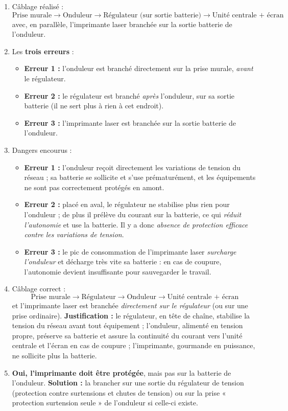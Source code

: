 \documentclass[11pt]{article}
\newcommand{\cle}[1]{{\popxbold\color{popdark}#1}}
\begin{document}
\begin{corrige}
\begin{enumerate}
\item Câblage réalisé :
\[ \text{Prise murale} \rightarrow \text{Onduleur} \rightarrow \text{Régulateur (sur sortie batterie)} \rightarrow \text{Unité centrale + écran} \]
avec, en parallèle, l'imprimante laser branchée sur la sortie batterie de l'onduleur.
\item Les \textbf{trois erreurs} :
\begin{itemize}
\item \textbf{Erreur 1 :} l'onduleur est branché directement sur la prise murale, \emph{avant} le régulateur.
\item \textbf{Erreur 2 :} le régulateur est branché \emph{après} l'onduleur, sur sa sortie batterie (il ne sert plus à rien à cet endroit).
\item \textbf{Erreur 3 :} l'imprimante laser est branchée sur la sortie batterie de l'onduleur.
\end{itemize}
\item Dangers encourus :
\begin{itemize}
\item \textbf{Erreur 1 :} l'onduleur reçoit directement les variations de tension du réseau ; sa batterie se sollicite et s'use prématurément, et les équipements ne sont pas correctement protégés en amont.
\item \textbf{Erreur 2 :} placé en aval, le régulateur ne stabilise plus rien pour l'onduleur ; de plus il prélève du courant sur la batterie, ce qui \emph{réduit l'autonomie} et use la batterie. Il y a donc \emph{absence de protection efficace contre les variations de tension}.
\item \textbf{Erreur 3 :} le pic de consommation de l'imprimante laser \emph{surcharge l'onduleur} et décharge très vite sa batterie : en cas de coupure, l'autonomie devient insuffisante pour sauvegarder le travail.
\end{itemize}
\item Câblage correct :
\[ \text{Prise murale} \rightarrow \text{Régulateur} \rightarrow \text{Onduleur} \rightarrow \text{Unité centrale + écran} \]
et l'imprimante laser est branchée \emph{directement sur le régulateur} (ou sur une prise ordinaire).
\textbf{Justification :} le régulateur, en tête de chaîne, stabilise la tension du réseau avant tout équipement ; l'onduleur, alimenté en tension propre, préserve sa batterie et assure la continuité du courant vers l'unité centrale et l'écran en cas de coupure ; l'imprimante, gourmande en puissance, ne sollicite plus la batterie.
\item \textbf{Oui, l'imprimante doit être protégée}, mais pas sur la batterie de l'onduleur. \textbf{Solution :} la brancher sur une sortie du \cle{régulateur de tension} (protection contre surtensions et chutes de tension) ou sur la prise « protection surtension seule » de l'onduleur si celle-ci existe.
\end{enumerate}


\end{corrige}
\end{document}
